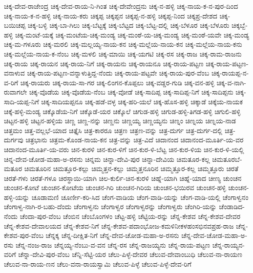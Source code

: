 {ಚಿಕ್ಕ-ದೇವ-ರಾಜೇಂದ್ರ
ಚಿಕ್ಕ-ದೇವ-ರಾಯ-ನಿ-ಗಿಂತ
ಚಿಕ್ಕ-ದೇವೇಂದ್ರನು
ಚಿಕ್ಕ-ನ-ಹಳ್ಳಿ
ಚಿಕ್ಕ-ನಾಯ-ಕ-ನ-ಪುರ-ದಿಂದ
ಚಿಕ್ಕ-ನಾಯ-ಕ-ನ-ಹಳ್ಳಿ
ಚಿಕ್ಕ-ನಾಯ-ಕರು
ಚಿಕ್ಕಪ್ಪ
ಚಿಕ್ಕಪ್ಪನ
ಚಿಕ್ಕಪ್ಪ-ನ-ಹಳ್ಳಿ
ಚಿಕ್ಕಪ್ಪ-ನಿಂದ
ಚಿಕ್ಕಪ್ರ-ದೇಶದ
ಚಿಕ್ಕ-ಬಯಿಚಪ್ಪ
ಚಿಕ್ಕ-ಬಳ್ಳಿ
ಚಿಕ್ಕ-ಬಾ-ಗಿಲು
ಚಿಕ್ಕ-ಬೆಟ್ಟಕ್ಕೆ
ಚಿಕ್ಕ-ಬೆಟ್ಟದ
ಚಿಕ್ಕ-ಬೆಟ್ಟ-ದಲ್ಲಿ
ಚಿಕ್ಕ-ಬೆಳೂರ
ಚಿಕ್ಕ-ಬೆಳೂರು
ಚಿಕ್ಕಬ್ಬೆ-ಹಳ್ಳಿ
ಚಿಕ್ಕ-ಮಂಟೆ-ಯಕ್ಕೆ
ಚಿಕ್ಕ-ಮಂಟೆಯ-ಚಿಕ್ಕ-ಮಂಡ್ಯ
ಚಿಕ್ಕ-ಮಂಠೆ-ಯ-ಚಿಕ್ಕ-ಮಂಡ್ಯ
ಚಿಕ್ಕ-ಮಂಠೆ-ಯವೇ
ಚಿಕ್ಕ-ಮಂಡ್ಯ
ಚಿಕ್ಕ-ಮ-ಗಳೂರು
ಚಿಕ್ಕ-ಮರಲಿ
ಚಿಕ್ಕ-ಮಲ್ಲಯ್ಯ-ನಾಯ-ಕನ
ಚಿಕ್ಕ-ಮಲ್ಲೆಯ-ನಾಯ-ಕನ
ಚಿಕ್ಕ-ಮಲ್ಲೆಯ-ನಾಯ-ಕನು
ಚಿಕ್ಕ-ಮಲ್ಲೆಯ-ನಾಯ-ಕ-ನೆಂಬ
ಚಿಕ್ಕ-ಮಳಲಿ
ಚಿಕ್ಕ-ಮಾಯಿ
ಚಿಕ್ಕ-ಯಗಟಿ
ಚಿಕ್ಕ-ರಸ
ಚಿಕ್ಕ-ರಾಜ
ಚಿಕ್ಕ-ರಾಮ-ರಾಜನು
ಚಿಕ್ಕ-ರಾಯ
ಚಿಕ್ಕ-ರಾಯನ
ಚಿಕ್ಕ-ರಾಯ-ನಿಗೆ
ಚಿಕ್ಕ-ರಾಯನು
ಚಿಕ್ಕ-ರಾಯನೂ
ಚಿಕ್ಕ-ರಾಯ-ಪಟ್ಟಣ
ಚಿಕ್ಕ-ರಾಯ-ಪಟ್ಟಣ-ವನಾಳುವ
ಚಿಕ್ಕ-ರಾಯ-ಪಟ್ಟಣ-ವನ್ನಾಳುತ್ತಿದ್ದ-ನೆಂದು
ಚಿಕ್ಕ-ರಾಯ-ಪಟ್ಟವೇ
ಚಿಕ್ಕ-ರಾಯ-ಪುರ-ವೆಂಬ
ಚಿಕ್ಕ-ರಾಯಪ್ಪ-ನ-ವ-ರಿಗೆ
ಚಿಕ್ಕ-ರಾಯರು
ಚಿಕ್ಕ-ರಾಯ-ಸಾ-ಗರ
ಚಿಕ್ಕ-ಲಿಂಗನ-ಕೊಪ್ಪಲು
ಚಿಕ್ಕ-ವಡ್ಡರ-ಗುಡಿ
ಚಿಕ್ಕ-ವನ-ಹಳ್ಳಿ
ಚಿಕ್ಕ-ವ-ನಾಗಿ-ರುವಾಗಲೇ
ಚಿಕ್ಕ-ವೊಡೆಯ
ಚಿಕ್ಕ-ವೊಡೆಯ-ನೆಂಬ
ಚಿಕ್ಕ-ವೋಡೆ
ಚಿಕ್ಕ-ಸಾದಿಪ್ಪ
ಚಿಕ್ಕ-ಸಾದಿಪ್ಪ-ನಿಗೆ
ಚಿಕ್ಕ-ಸಾದಿಪ್ಪನು
ಚಿಕ್ಕ-ಸಾದಿ-ಯಪ್ಪ-ನಿಗೆ
ಚಿಕ್ಕ-ಸಾದಿಯಪ್ಪನೂ
ಚಿಕ್ಕ-ಹಡೆ-ವಳ್ಳ
ಚಿಕ್ಕ-ಹರಿ-ಯಲೆ
ಚಿಕ್ಕ-ಹೊಸ-ಹಳ್ಳಿ
ಚಿಕ್ಕಾಡೆ
ಚಿಕ್ಕೆಯ-ನಾಯಕ
ಚಿಕ್ಕೆ-ಹಳ್ಳಿ-ಮಂಡ್ಯ
ಚಿಕ್ಕೊಡೆಯ-ನಿಗೆ
ಚಿಕ್ಕೊಡೆ-ಯರ
ಚಿಕ್ಕೊಲೆ
ಚಿಗುಡ-ಹಳ್ಳಿ
ಚಿಗುಡ-ಹಳ್ಳಿ-ತಿಗಡ-ಹಳ್ಳಿ
ಚಿಗುಲಿ-ಹಳ್ಳಿ
ಚಿಟ್ಟನ-ಹಳ್ಳಿ
ಚಿಟ್ಟನ-ಹಳ್ಳಿಯ
ಚಿಣ್ಣ
ಚಿಣ್ಣ-ನನ್ನು
ಚಿಣ್ಣನು
ಚಿಣ್ಣಯ್ಯ
ಚಿಣ್ಣಯ್ಯನು
ಚಿಣ್ನಂ
ಚಿಣ್ನಯ
ಚಿಣ್ನಯ-ನಾಡ
ಚಿತ್ತಮಂ
ಚಿತ್ತ-ವಲ್ಲಭೆ-ಯಾದ
ಚಿತ್ತೈಸಿ
ಚಿತ್ರ-ಕಾರರೂ
ಚಿತ್ರಣ
ಚಿತ್ರಣ-ವನ್ನು
ಚಿತ್ರ-ದುರ್ಗ
ಚಿತ್ರ-ದುರ್ಗ-ದಲ್ಲಿ
ಚಿತ್ರ-ದುರ್ಗವು
ಚಿತ್ರಭಾನು
ಚಿತ್ರಮ-ಕೊಂಡ-ನಾಯ-ಕನ
ಚಿತ್ರ-ವನ್ನು
ಚಿತ್ರ-ವಿದೆ
ಚಿದಾನಂದ
ಚಿದಾನಂದ-ಮೂರ್ತಿ-ಯ-ವರ
ಚಿದಾನಂದ-ಮೂರ್ತಿ-ಯ-ವರು
ಚಿನ-ಕುರಳಿ
ಚಿನ-ಕುರ-ಳಿಗೆ
ಚಿನ-ಕುರ-ಳಿ-ಬೆಟ್ಟ
ಚಿನ-ಕುರ-ಳಿಯ
ಚಿನ-ಕುರ-ಳಿ-ಯಲ್ಲಿ
ಚಿನ್ನ-ದೇವ-ಚೋಡ-ಮಹಾ-ಅ-ರಸನು
ಚಿನ್ನಮ
ಚಿನ್ನಾ-ದೇವಿ-ಪುರ
ಚಿನ್ನಾ-ದೇವಿಯ
ಚಿಮತೂರ-ಕಲ್ಲ
ಚಿಮತೂರಬೆ-ಮತೂರ
ಚಿಮತೂರಿನ
ಚಿಮತ್ತೂರ-ಕಲ್ಲು
ಚಿಮ್ಮತ್ತನ-ಕಲ್ಲು
ಚಿಮ್ಮತ್ತನೂರಿನ
ಚಿಮ್ಮತ್ತೂರ-ಕಲ್ಲ
ಚಿಮ್ಮತ್ತೂರು
ಚಿರತೆ
ಚಿರತೆ-ಗಳು
ಚಿರತೆ-ಗಳೂ
ಚಿರಸ್ಥಾಯಿ-ಯಾಗಿ
ಚಿಲ-ಕುರ್ಲಿ-ಚಿನ-ಕುರಳಿ
ಚಿಹ್ನೆ-ಯಾಗಿ
ಚಿಹ್ನೆ-ಯಾದ
ಚೀಣ್ಯ
ಚುಂಚನ
ಚುಂಚನ-ಕೋಟೆ
ಚುಂಚನ-ಕೋಟೆಯ
ಚುಂಚನ-ಗಿರಿ
ಚುಂಚನ-ಗಿರಿಯ
ಚುಂಚನ-ಭಯಿರವ
ಚುಂಚನ-ಹಳ್ಳಿ
ಚುಂಚನ-ಹಳ್ಳಿ-ಯನ್ನು
ಚೂಡಾಮಣಿ
ಚೂರ್ಣೀ-ಕರಿ-ಸಿದ
ಚೆಂಗ-ವಾಡಿಯ
ಚೆಂಗ-ವಾಡಿ-ಯನ್ನು
ಚೆಂಗ-ವಾಡಿ-ಯಲ್ಲಿ
ಚೆಂಗಾಳ್ವನಂ
ಚೆಂಗಾಳ್ವ-ನಾಗಿ-ರ-ಬಹು-ದೆಂದು
ಚೆಂಗಾಳ್ವನು
ಚೆಂಗಾಳ್ವರ
ಚೆಂಗಾಳ್ವರನ್ನು
ಚೆಂಗಾಳ್ವರು
ಚೆಂಗಿರಿ-ಯನ್ನು
ಚೆಂಡಾಡಿದ-ನೆಂದು
ಚೆಂದಾ-ಪುರ-ವೆಂಬ
ಚೆಂಬಿನ
ಚೆಂಬೊಂಗಳಂ
ಚೆಟ್ಟ-ಹಳ್ಳಿ
ಚೆಟ್ಟಿಯ-ರನ್ನು
ಚೆನ್ನ-ಕೇಶವ
ಚೆನ್ನ-ಕೇಶವ-ದೇವರ
ಚೆನ್ನ-ಕೇಶವ-ದೇವಾಲಯದ
ಚೆನ್ನ-ಕೇಶವ-ನಿಗೆ
ಚೆನ್ನ-ಕೇಶವ-ಪದಾಂಭೋಜ-ಕಮಳಿನೀಕಳಹಂಸಭಿನವಪ್ರಹ-ರಾಜ
ಚೆನ್ನ-ಕೇಶವ-ಪುರ-ವೆಂಬ
ಚೆನ್ನಕ್ಕ
ಚೆನ್ನ-ದೀಕ್ಷಿತ-ನಿಗೆ
ಚೆನ್ನ-ದೇವ-ಚೋಡ-ಮಹಾ-ಅ-ರಸನು
ಚೆನ್ನ-ದೇವ-ಚೋಡ-ಮಹಾ-ಅ-ರಸು
ಚೆನ್ನ-ನಂಜ-ರಾಜ
ಚೆನ್ನಯ್ಯ-ನೆಂಬು-ವ-ವನ
ಚೆನ್ನ-ರಸ
ಚೆನ್ನ-ರಾಜಯ್ಯನು
ಚೆನ್ನ-ರಾಯ-ಪಟ್ಟಣ
ಚೆನ್ನ-ರಾಯ್ಯನ-ವರಿಗೆ
ಚೆನ್ನಾ-ದೇವಿ-ಪುರ-ವೆಂಬ
ಚೆನ್ನಿ-ಸೆಟ್ಟಿ-ಯರ
ಚೆಲು-ಪಿಳ್ಳೆ-ದೇವರ
ಚೆಲುವ-ದೇವಾಂಬುಧಿ
ಚೆಲುವ-ನಾ-ರಾಯಣ
ಚೆಲುವ-ನಾ-ರಾಯ-ಣನ
ಚೆಲು-ವನಾ-ರಾಯಸ್ವಾಮಿ
ಚೆಲುವ-ಪಿಳ್ಳೆ
ಚೆಲುವ-ಪಿಳ್ಳೆ-ದೇವ-ರಿಗೆ
}
